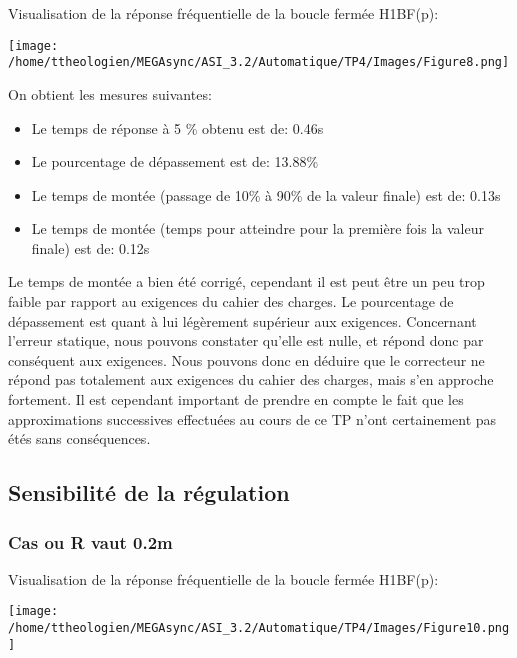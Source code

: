 \documentclass[a4paper,12pt]{article}
\begin{document}
			\par Visualisation de la réponse fréquentielle de la boucle fermée H1BF(p):
			\begin{center}
				\texttt{[image: /home/ttheologien/MEGAsync/ASI\_3.2/Automatique/TP4/Images/Figure8.png]}
			\end{center}

			\par On obtient les mesures suivantes:
			\begin{itemize}
				\item Le temps de réponse à 5 \% obtenu est de: 0.46s
				\item Le pourcentage de dépassement est de: 13.88\%
				\item Le temps de montée (passage de 10\% à 90\% de la valeur finale) est de: 0.13s
				\item Le temps de montée (temps pour atteindre pour la première fois la valeur finale) est de: 0.12s\\
			\end{itemize}
			\par Le temps de montée a bien été corrigé, cependant il est peut être un peu trop faible par rapport au exigences du cahier des charges.
			Le pourcentage de dépassement est quant à lui légèrement supérieur aux exigences.
			Concernant l'erreur statique, nous pouvons constater qu'elle est nulle, et répond donc par conséquent aux exigences.
			Nous pouvons donc en déduire que le correcteur ne répond pas totalement aux exigences du cahier des charges, mais s'en approche fortement.
			Il est cependant important de prendre en compte le fait que les approximations successives effectuées au cours de ce TP n'ont certainement pas étés sans conséquences.
			\pagebreak

		\subsection{Sensibilité de la régulation}
			\subsubsection{Cas ou R vaut 0.2m}
				\par Visualisation de la réponse fréquentielle de la boucle fermée H1BF(p):
				\begin{center}
					\texttt{[image: /home/ttheologien/MEGAsync/ASI\_3.2/Automatique/TP4/Images/Figure10.png]}
				\end{center}
\end{document}
